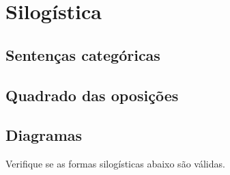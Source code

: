 \normalsize
\part{Silogística}
\label{ch.Syllogism}

\chapter{Sentenças categóricas}
\label{s:CategoricalSentences}

\chapter{Quadrado das oposições}
\label{s:SquareOfOppositions}

\chapter{Diagramas}

\problempart
\label{pr.SY.diagrams.args}
Verifique se as formas silogísticas abaixo são válidas.
\begin{earg}
	\item 
	\item 
	\item 
	\item 
	\item 
	\item 
\end{earg}
